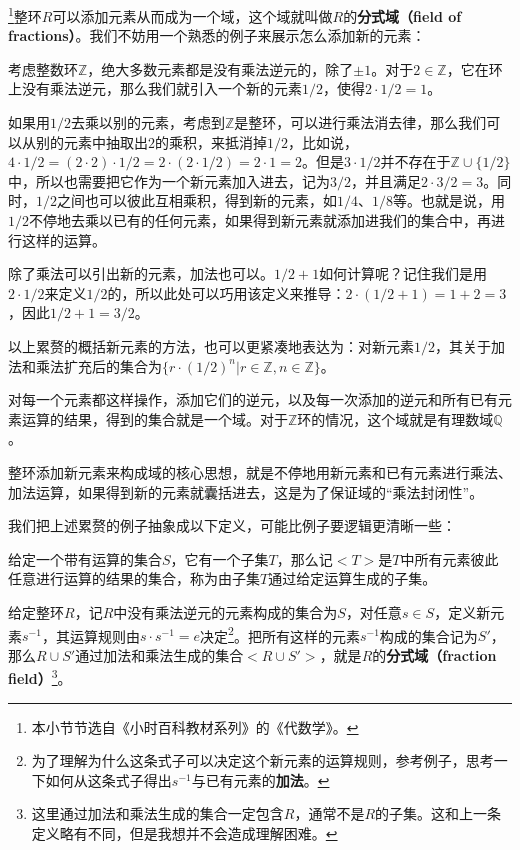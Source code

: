 



\footnote{本小节节选自《小时百科教材系列》的《代数学》。}整环$R$可以添加元素从而成为一个域，这个域就叫做$R$的\textbf{分式域（field of fractions）}。我们不妨用一个熟悉的例子来展示怎么添加新的元素：

\begin{example}{}
考虑整数环$\mathbb{Z}$，绝大多数元素都是没有乘法逆元的，除了$\pm 1$。对于$2\in\mathbb{Z}$，它在环上没有乘法逆元，那么我们就引入一个新的元素$1/2$，使得$2\cdot 1/2=1$。

如果用$1/2$去乘以别的元素，考虑到$\mathbb{Z}$是整环，可以进行乘法消去律，那么我们可以从别的元素中抽取出$2$的乘积，来抵消掉$1/2$，比如说，$4\cdot 1/2=(2\cdot 2)\cdot 1/2=2\cdot(2\cdot 1/2)=2\cdot 1=2$。但是$3\cdot 1/2$并不存在于$\mathbb{Z}\cup\{1/2\}$中，所以也需要把它作为一个新元素加入进去，记为$3/2$，并且满足$2\cdot 3/2=3$。同时，$1/2$之间也可以彼此互相乘积，得到新的元素，如$1/4$、$1/8$等。也就是说，用$1/2$不停地去乘以已有的任何元素，如果得到新元素就添加进我们的集合中，再进行这样的运算。

除了乘法可以引出新的元素，加法也可以。$1/2+1$如何计算呢？记住我们是用$2\cdot 1/2$来定义$1/2$的，所以此处可以巧用该定义来推导：$2\cdot(1/2+1)=1+2=3$，因此$1/2+1=3/2$。

以上累赘的概括新元素的方法，也可以更紧凑地表达为：对新元素$1/2$，其关于加法和乘法扩充后的集合为$\{r\cdot (1/2)^n|r\in\mathbb{Z}, n\in \mathbb{Z}\}$。

对每一个元素都这样操作，添加它们的逆元，以及每一次添加的逆元和所有已有元素运算的结果，得到的集合就是一个域。对于$\mathbb{Z}$环的情况，这个域就是有理数域$\mathbb{Q}$。
\end{example}

整环添加新元素来构成域的核心思想，就是不停地用新元素和已有元素进行乘法、加法运算，如果得到新的元素就囊括进去，这是为了保证域的“乘法封闭性”。

我们把上述累赘的例子抽象成以下定义，可能比例子要逻辑更清晰一些：

\begin{definition}{}
给定一个带有运算的集合$S$，它有一个子集$T$，那么记$<T>$是$T$中所有元素彼此任意进行运算的结果的集合，称为由子集$T$通过给定运算生成的子集。
\end{definition}

\begin{definition}{}
给定整环$R$，记$R$中没有乘法逆元的元素构成的集合为$S$，对任意$s\in S$，定义新元素$s^{-1}$，其运算规则由$s\cdot s^{-1}=e$决定\footnote{为了理解为什么这条式子可以决定这个新元素的运算规则，参考例子，思考一下如何从这条式子得出$s^{-1}$与已有元素的\textbf{加法}。}。把所有这样的元素$s^{-1}$构成的集合记为$S'$，那么$R\cup S'$通过加法和乘法生成的集合$<R\cup S'>$，就是$R$的\textbf{分式域（fraction field）}\footnote{这里通过加法和乘法生成的集合一定包含$R$，通常不是$R$的子集。这和上一条定义略有不同，但是我想并不会造成理解困难。}。
\end{definition}


